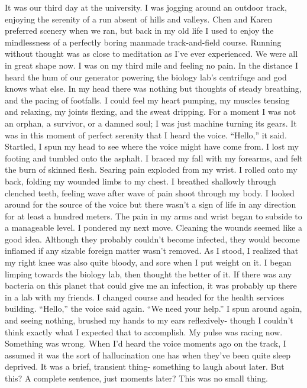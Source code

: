 \documentclass[a4paper]{article}
\begin{document}
It was our third day at the university. I was jogging around an outdoor track, enjoying the serenity of a run absent of hills and valleys. Chen and Karen preferred scenery when we ran, but back in my old life I used to enjoy the mindlessness of a perfectly boring manmade track-and-field course. Running without thought was as close to meditation as I’ve ever experienced.
We were all in great shape now. I was on my third mile and feeling no pain. In the distance I heard the hum of our generator powering the biology lab’s centrifuge and god knows what else.
In my head there was nothing but thoughts of steady breathing, and the pacing of footfalls. I could feel my heart pumping, my muscles tensing and relaxing, my joints flexing, and the sweat dripping. For a moment I was not an orphan, a survivor, or a damned soul; I was just machine turning its gears.
It was in this moment of perfect serenity that I heard the voice. “Hello,” it said.
Startled, I spun my head to see where the voice might have come from. I lost my footing and tumbled onto the asphalt. I braced my fall with my forearms, and felt the burn of skinned flesh. Searing pain exploded from my wrist.
I rolled onto my back, folding my wounded limbs to my chest. I breathed shallowly through clenched teeth, feeling wave after wave of pain shoot through my body. I looked around for the source of the voice but there wasn’t a sign of life in any direction for at least a hundred meters.
The pain in my arms and wrist began to subside to a manageable level. I pondered my next move. Cleaning the wounds seemed like a good idea. Although they probably couldn’t become infected, they would become inflamed if any sizable foreign matter wasn’t removed.
As I stood, I realized that my right knee was also quite bloody, and sore when I put weight on it. I began limping towards the biology lab, then thought the better of it. If there was any bacteria on this planet that could give me an infection, it was probably up there in a lab with my friends. I changed course and headed for the health services building.
“Hello,” the voice said again. “We need your help.”
I spun around again, and seeing nothing, brushed my hands to my ears reflexively- though I couldn’t think exactly what I expected that to accomplish. My pulse was racing now. Something was wrong.
When I’d heard the voice moments ago on the track, I assumed it was the sort of hallucination one has when they’ve been quite sleep deprived. It was a brief, transient thing- something to laugh about later. But this? A complete sentence, just moments later? This was no small thing.
\end{document}
